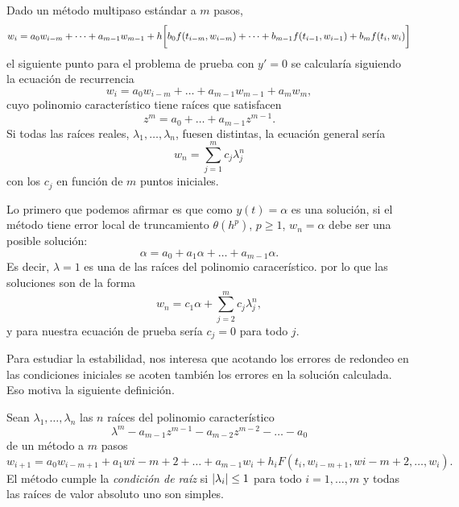 Dado un método multipaso estándar a $m$ pasos,
\begin{equation*}
    w_i = a_0w_{i-m} + \dots + a_{m-1}w_{m-1} + h\qty\bigg[
        b_0f(t_{i-m}, w_{i-m}) + \dots + b_{m-1}f(t_{i-1}, w_{i-1})
        + b_mf(t_i, w_i)
    ]
\end{equation*}
el siguiente punto para el problema de prueba con $y' = 0$ se calcularía
siguiendo la ecuación de recurrencia
\begin{equation*}
    w_i = a_0w_{i-m} + \dots + a_{m-1}w_{m-1} + a_mw_m,
\end{equation*}
cuyo polinomio característico tiene raíces que satisfacen
\begin{equation*}
    z^m = a_0 + \dots + a_{m-1}z^{m-1}.
\end{equation*}
Si todas las raíces reales, $\lambda_1,\dots,\lambda_n$, fuesen distintas,
la ecuación general sería
\begin{equation*}
    w_n = \sum_{j=1}^m c_j\lambda_j^n
\end{equation*}
con los $c_j$ en función de $m$ puntos iniciales.

Lo primero que podemos afirmar es que como $y(t) = \alpha$ es una solución,
si el método tiene error local de truncamiento $\theta(h^p)$, $p \ge 1$,
$w_n = \alpha$ debe ser una posible solución:
\begin{equation*}
    \alpha = a_0 + a_1\alpha + \dots + a_{m-1}\alpha.
\end{equation*}
Es decir, $\lambda = 1$ es una de las raíces del polinomio caracerístico.
por lo que las soluciones son de la forma
\begin{equation*}
    w_n = c_1\alpha + \sum_{j=2}^m c_j\lambda_j^n,
\end{equation*}
y para nuestra ecuación de prueba sería $c_j = 0$ para todo $j$.

Para estudiar la estabilidad,
nos interesa que acotando los errores de redondeo en las condiciones iniciales
se acoten también los errores en la solución calculada.
Eso motiva la siguiente definición.

\begin{definition}
    Sean $\lambda_1,\ldots,\lambda_n$ las $n$ raíces del
    polinomio característico
    \begin{equation*}
        \lambda^m - a_{m-1}z^{m-1} - a_{m-2}z^{m-2} - \dots - a_0
    \end{equation*}
    de un método a $m$ pasos
    \begin{equation}\label{eqn:multistep}
        w_{i+1} = a_0w_{i-m+1} + a_1w{i-m+2} + \dots + a_{m-1}w_i
            + h_iF(t_i,w_{i-m+1},w{i-m+2},\dots,w_i).
    \end{equation}
    El método cumple la \emph{condición de raíz} si
    $\abs{\lambda_i} \le 1$ para todo $i = 1,\ldots, m$
    y todas las raíces de valor absoluto uno son simples.
\end{definition}

